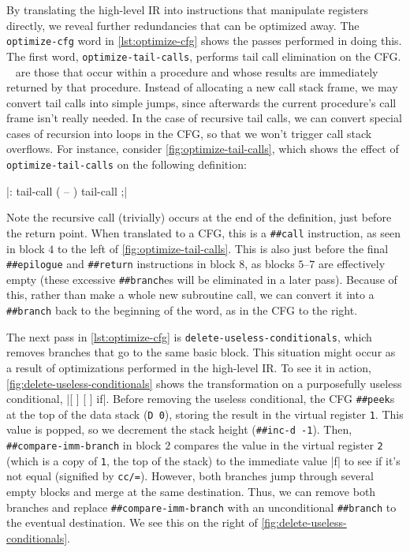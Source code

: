 By translating the high-level \gls{IR} into instructions that manipulate
registers directly, we reveal further redundancies that can be optimized away.
The \Verb|optimize-cfg| word in \vref{lst:optimize-cfg} shows the passes
performed in doing this.  The first word, \Verb|optimize-tail-calls|,
performs tail call elimination on the \gls{CFG}.
%
~ are those
that occur within a procedure and whose results are immediately returned by
that procedure.  Instead of allocating a new call stack frame, we may convert
tail calls into simple jumps, since afterwards the current procedure's call
frame isn't really needed.  In the case of recursive tail calls, we can convert
special cases of recursion into loops in the \gls{CFG}, so that we won't
trigger call stack overflows.  For instance, consider
\vref{fig:optimize-tail-calls}, which shows the effect of
\Verb|optimize-tail-calls| on the following definition:
%
\begin{center}
%
  \factor|: tail-call ( -- ) tail-call ;|
%
\end{center}
%
\noindent Note the recursive call (trivially) occurs at the end of the
definition, just before the return point.  When translated to a \gls{CFG}, this
is a \Verb|##call| instruction, as seen in block $4$ to the left of
\vref{fig:optimize-tail-calls}.  This is also just before the final
\Verb|##epilogue| and \Verb|##return| instructions in block $8$, as blocks
$5$--$7$ are effectively empty (these excessive \Verb|##branch|es will be
eliminated in a later pass).  Because of this, rather than make a whole new
subroutine call, we can convert it into a \Verb|##branch| back to the
beginning of the word, as in the \gls{CFG} to the right.


The next pass in \vref{lst:optimize-cfg} is
\Verb|delete-useless-conditionals|, which removes branches that go to the
same basic block.  This situation might occur as a result of optimizations
performed in the high-level \gls{IR}.  To see it in action,
\vref{fig:delete-useless-conditionals} shows the transformation on a
purposefully useless conditional,
%
\factor|[ ] [ ] if|.
%
Before removing the useless conditional, the \gls{CFG} \Verb|##peek|s at the
top of the data stack
%
(\Verb|D 0|),
%
storing the result in the virtual register \Verb|1|.  This value is popped,
so we decrement the stack height
%
(\Verb|##inc-d -1|).
%
Then, \Verb|##compare-imm-branch| in block $2$ compares the value in the
virtual register \Verb|2| (which is a copy of \Verb|1|, the top of the
stack) to the immediate value \factor|f| to see if it's not equal (signified by
\Verb|cc/=|).  However, both branches jump through several empty blocks and
merge at the same destination.  Thus, we can remove both branches and replace
\Verb|##compare-imm-branch| with an unconditional \Verb|##branch| to the
eventual destination.  We see this on the right of
\vref{fig:delete-useless-conditionals}.

